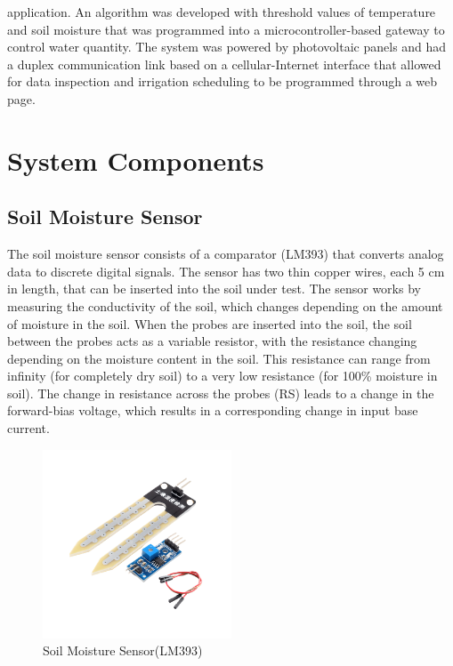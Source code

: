 \documentclass[conference]{IEEEtran}
\begin{document}
application. An algorithm was developed with threshold values of temperature and soil moisture that was programmed into a microcontroller-based gateway to control water quantity. The system was powered by photovoltaic panels and had a duplex communication link based on a cellular-Internet interface that allowed for data inspection and irrigation scheduling to be programmed through a web page\cite{c6}.
	
	\maketitle
	\section{System Components}
	\subsection{Soil Moisture Sensor}
	The soil moisture sensor consists of a comparator (LM393) that converts analog data to discrete digital signals. The sensor has two thin copper wires, each 5 cm in length, that can be inserted into the soil under test. The sensor works by measuring the conductivity of the soil, which changes depending on the amount of moisture in the soil. When the probes are inserted into the soil, the soil between the probes acts as a variable resistor, with the resistance changing depending on the moisture content in the soil. This resistance can range from infinity (for completely dry soil) to a very low resistance (for 100\% moisture in soil). The change in resistance across the probes (RS) leads to a change in the forward-bias voltage, which results in a corresponding change in input base current\cite{c7}.
	\begin{figure}[H]
		\includegraphics[width=0.5\textwidth] {Soil-Moisture-Sensors}
		\caption{Soil Moisture Sensor(LM393)}
	\end{figure}
	
\end{document}
